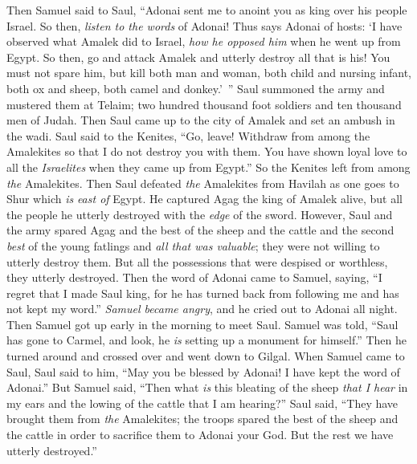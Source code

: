 \begin{biblechapter} %
 Then Samuel said to Saul, “Adonai sent me to anoint you as king over his people Israel. So then, \textit{listen to the words} of Adonai!
\verse Thus says Adonai of hosts: ‘I have observed what Amalek did to Israel, \textit{how he opposed him} when he went up from Egypt.
\verse So then, go and attack Amalek and utterly destroy all that is his! You must not spare him, but kill both man and woman, both child and nursing infant, both ox and sheep, both camel and donkey.’ ”
\verse Saul summoned the army and mustered them at Telaim; two hundred thousand foot soldiers and ten thousand men of Judah.
\verse Then Saul came up to the city of Amalek and set an ambush in the wadi.
\verse Saul said to the Kenites, “Go, leave! Withdraw from among the Amalekites so that I do not destroy you with them. You have shown loyal love to all the \textit{Israelites} when they came up from Egypt.” So the Kenites left from among \textit{the} Amalekites.
\verse Then Saul defeated \textit{the} Amalekites from Havilah as one goes to Shur which \textit{is} \textit{east of} Egypt.
\verse He captured Agag the king of Amalek alive, but all the people he utterly destroyed with the \textit{edge} of the sword.
\verse However, Saul and the army spared Agag and the best of the sheep and the cattle and the second \textit{best} of the young fatlings and \textit{all that was valuable}; they were not willing to utterly destroy them. But all the possessions that were despised or worthless, they utterly destroyed.
 Then the word of Adonai came to Samuel, saying,
\verse “I regret that I made Saul king, for he has turned back from following me and has not kept my word.” \textit{Samuel became angry}, and he cried out to Adonai all night.
\verse Then Samuel got up early in the morning to meet Saul. Samuel was told, “Saul has gone to Carmel, and look, he \textit{is} setting up a monument for himself.” Then he turned around and crossed over and went down to Gilgal.
\verse When Samuel came to Saul, Saul said to him, “May you be blessed by Adonai! I have kept the word of Adonai.”
\verse But Samuel said, “Then what \textit{is} this bleating of the sheep \textit{that I hear} in my ears and the lowing of the cattle that I am hearing?”
\verse Saul said, “They have brought them from \textit{the} Amalekites; the troops spared the best of the sheep and the cattle in order to sacrifice them to Adonai your God. But the rest we have utterly destroyed.”

\end{biblechapter}
